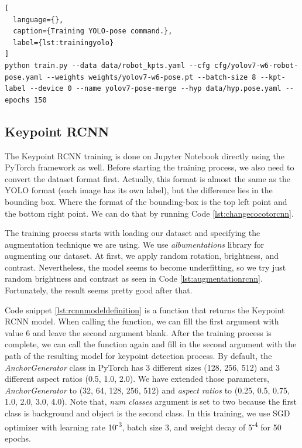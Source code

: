 \begin{lstlisting}[
  language={},
  caption={Training YOLO-pose command.},
  label={lst:trainingyolo}
]
python train.py --data data/robot_kpts.yaml --cfg cfg/yolov7-w6-robot-pose.yaml --weights weights/yolov7-w6-pose.pt --batch-size 8 --kpt-label --device 0 --name yolov7-pose-merge --hyp data/hyp.pose.yaml --epochs 150
\end{lstlisting}

\subsection{Keypoint RCNN}
\label{subsec:trainingrcnn}

The Keypoint RCNN training is done on Jupyter Notebook directly using the PyTorch framework as well.
Before starting the training process, we also need to convert the dataset format first.
Actually, this format is almost the same as the YOLO format (each image has its own label), but the difference lies in the bounding box.
Where the format of the bounding-box is the top left point and the bottom right point. We can do that by running Code \ref{lst:changecocotorcnn}.



The training process starts with loading our dataset and specifying the augmentation technique we are using. We use \emph{albumentations} library for augmenting our dataset.
At first, we apply random rotation, brightness, and contrast. Nevertheless, the model seems to become underfitting, so we try just random brightness and contrast as seen in Code \ref{lst:augmentationrcnn}. 
Fortunately, the result seems pretty good after that.



Code snippet \ref{lst:rcnnmodeldefinition} is a function that returns the Keypoint RCNN model.
When calling the function, we can fill the first argument with value 6
and leave the second argument blank. After the training process is complete, we can call the function again and fill in the second argument with the path of the resulting model for keypoint detection process.
By default, the \emph{AnchorGenerator} class in PyTorch has 3 different sizes (128, 256, 512) and 3 different aspect ratios (0.5, 1.0, 2.0).
We have extended those parameters, \emph{AnchorGenerator} to (32, 64, 128, 256, 512) and \emph{aspect ratios} to (0.25, 0.5, 0.75, 1.0, 2.0, 3.0, 4.0).
Note that, \emph{num classes} argument is set to two because the first class is background and object is the second class.
In this training, we use SGD optimizer with learning rate 10\textsuperscript{-3}, batch size 3, and weight decay of 5\textsuperscript{-4} for 50 epochs.

